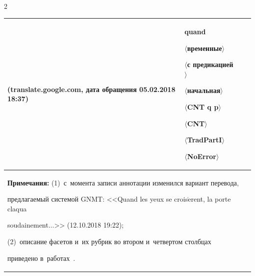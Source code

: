 \begin{multicols}{2}
\begin{enumerate}[(1)]
\begin{table}
\begin{center}
\begin{tabular}{|p{57mm}|p{23mm}|p{38mm}|p{25mm}|}
\newline


({\sf translate.google.com}, дата обращения 05.02.2018 18:37) 


&  \textbf{quand}\newline


$\langle$временные$\rangle$\newline 


$\langle$с предикацией$\rangle$\newline


$\langle$начальная$\rangle$\newline


$\langle$CNT q p$\rangle$\newline 


$\langle$CNT$\rangle$\newline


$\langle$TradPartI$\rangle$\newline


$\langle$NoError$\rangle$\\


\hline


\multicolumn{4}{p{158mm}}{\footnotesize


    \hspace*{2mm}\textbf{Примечания:} (1)~с~момента записи аннотации изменился вариант перевода, 


предлагаемый системой GNMT: <<Quand les yeux se crois$\grave{\mbox{e}}$rent, la porte claqua 


soudainement$\ldots$>> (12.10.2018 19:22);


(2)~описание фасетов и~их рубрик во втором и~четвертом столбцах 


приведено в~работах~\cite{8-gz, 17-gz}.}


    \end{tabular}


    \end{center}






\begin{center}




\vspace*{2ex}









\end{center}
\end{table}
\end{enumerate}
\end{multicols}
